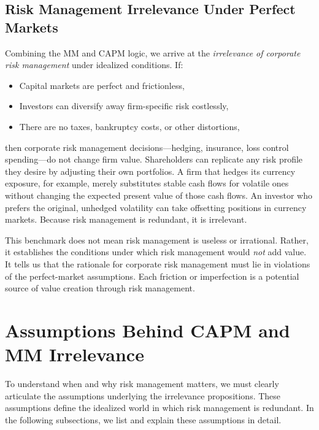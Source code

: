 \documentclass[11pt,openany]{book}
\providecommand{\tightlist}{\setlength{\itemsep}{0pt}\setlength{\parskip}{0pt}}
\begin{document}
\subsection{Risk Management Irrelevance Under Perfect Markets}\label{risk-management-irrelevance-under-perfect-markets}

Combining the MM and CAPM logic, we arrive at the \emph{irrelevance of corporate risk management} under idealized conditions. If:

\begin{itemize}
\tightlist
\item
  Capital markets are perfect and frictionless,
\item
  Investors can diversify away firm-specific risk costlessly,
\item
  There are no taxes, bankruptcy costs, or other distortions,
\end{itemize}

then corporate risk management decisions---hedging, insurance, loss control spending---do not change firm value. Shareholders can replicate any risk profile they desire by adjusting their own portfolios. A firm that hedges its currency exposure, for example, merely substitutes stable cash flows for volatile ones without changing the expected present value of those cash flows. An investor who prefers the original, unhedged volatility can take offsetting positions in currency markets. Because risk management is redundant, it is irrelevant.

This benchmark does not mean risk management is useless or irrational. Rather, it establishes the conditions under which risk management would \emph{not} add value. It tells us that the rationale for corporate risk management must lie in violations of the perfect-market assumptions. Each friction or imperfection is a potential source of value creation through risk management.


\section{Assumptions Behind CAPM and MM Irrelevance}\label{assumptions-behind-capm-and-mm-irrelevance}

To understand when and why risk management matters, we must clearly articulate the assumptions underlying the irrelevance propositions. These assumptions define the idealized world in which risk management is redundant. In the following subsections, we list and explain these assumptions in detail.
\end{document}
